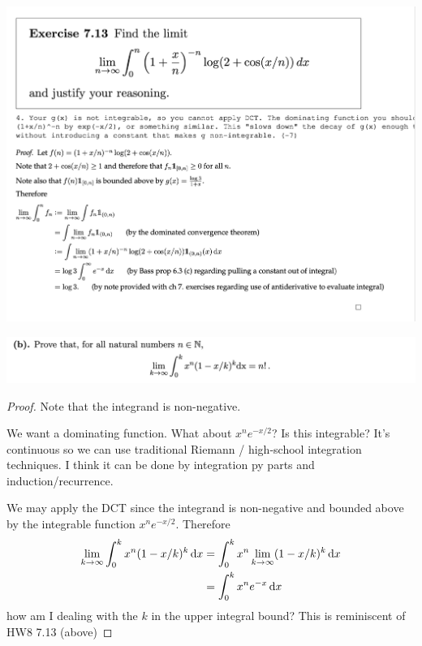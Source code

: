 
\begin{mdframed}
\includegraphics[width=400pt]{img/analysis--berkeley-202a-final-5921.png}
\end{mdframed}

\begin{mdframed}
\includegraphics[width=400pt]{img/analysis--berkeley-202a-final-96cc.png}
\end{mdframed}

\begin{proof}

  Note that the integrand is non-negative.

  We want a dominating function. What about $x^ne^{-x/2}$? Is this integrable? It's continuous so we can use
  traditional Riemann / high-school integration techniques. I think it can be done by integration py parts and
  induction/recurrence.

  We may apply the DCT since the integrand is non-negative and bounded above by the integrable
  function $x^ne^{-x/2}$. Therefore
  \begin{align*}
    \lim_{k \to \infty} \int_0^k x^n (1 - x/k)^k \dx
    &= \int_0^k x^n \lim_{k \to \infty} (1 - x/k)^k \dx \\
    &= \int_0^k x^n e^{-x} \dx \\
  \end{align*}
   how am I dealing with the $k$ in the upper integral bound? This is reminiscent of HW8 7.13 (above)
\end{proof}

